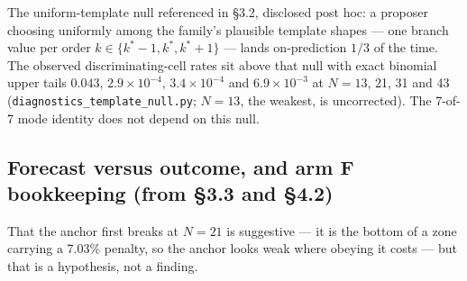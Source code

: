 The uniform-template null referenced in \S3.2, disclosed post hoc: a proposer choosing uniformly
among the family's plausible template shapes --- one branch value per order
$k \in \{k^*{-}1, k^*, k^*{+}1\}$ --- lands on-prediction $1/3$ of the time. The observed
discriminating-cell rates sit above that null with exact binomial upper tails $0.043$,
$2.9\times10^{-4}$, $3.4\times10^{-4}$ and $6.9\times10^{-3}$ at $N = 13$, 21, 31 and 43
(\texttt{diagnostics\_template\_null.py}; $N = 13$, the weakest, is uncorrected). The 7-of-7 mode
identity does not depend on this null.

\subsection{Forecast versus outcome, and arm F bookkeeping (from \S3.3 and \S4.2)}

That the anchor first breaks at $N = 21$ is suggestive --- it is the bottom of a zone carrying a
7.03\% penalty, so the anchor looks weak where obeying it costs --- but that is a hypothesis, not
a finding.

